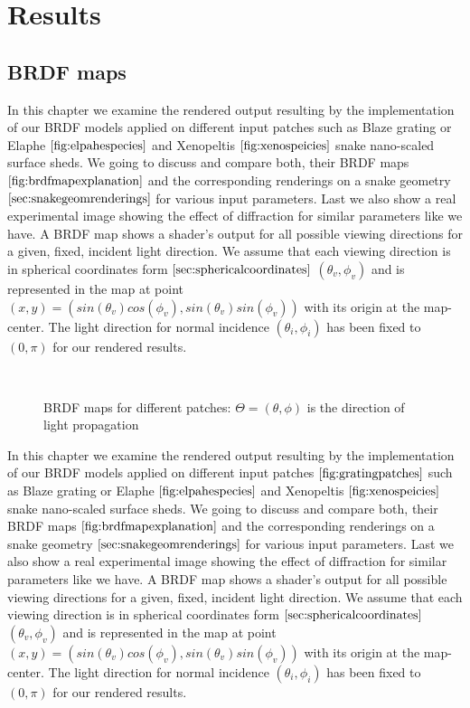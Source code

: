 \chapter{Results}
\section{BRDF maps}
In this chapter we examine the rendered output resulting by the implementation of our BRDF models applied on different input patches such as Blaze grating or Elaphe $\ref{fig:elpahespecies}$ and Xenopeltis $\ref{fig:xenospeicies}$ snake nano-scaled surface sheds. We going to discuss and compare both, their BRDF maps $\ref{fig:brdfmapexplanation}$ and the corresponding renderings on a snake geometry $\ref{sec:snakegeomrenderings}$ for various input parameters. Last we also show a real experimental image showing the effect of diffraction for similar parameters like we have. 
A BRDF map shows a shader's output for all possible viewing directions for a given, fixed, incident light direction. We assume that each viewing direction is in spherical coordinates form $\ref{sec:sphericalcoordinates}$ $(\theta_v, \phi_v)$ and is represented in the map at point $(x,y) = (sin(\theta_v)cos(\phi_v), sin(\theta_v)sin(\phi_v))$ with its origin at the map-center. The light direction for normal incidence $(\theta_i, \phi_i)$ has been fixed to $(0,\pi)$ for our rendered results.

\begin{figure}[H]
  \centering
~
~

\caption{BRDF maps for different patches: $\Theta=(\theta,\phi)$ is the direction of light propagation}
\label{fig:brdfmapexplanation}
\end{figure}

In this chapter we examine the rendered output resulting by the implementation of our BRDF models applied on different input patches $\ref{fig:gratingpatches}$ such as Blaze grating or Elaphe $\ref{fig:elpahespecies}$ and Xenopeltis $\ref{fig:xenospeicies}$ snake nano-scaled surface sheds. We going to discuss and compare both, their BRDF maps $\ref{fig:brdfmapexplanation}$ and the corresponding renderings on a snake geometry $\ref{sec:snakegeomrenderings}$ for various input parameters. Last we also show a real experimental image showing the effect of diffraction for similar parameters like we have. 
A BRDF map shows a shader's output for all possible viewing directions for a given, fixed, incident light direction. We assume that each viewing direction is in spherical coordinates form $\ref{sec:sphericalcoordinates}$ $(\theta_v, \phi_v)$ and is represented in the map at point $(x,y) = (sin(\theta_v)cos(\phi_v), sin(\theta_v)sin(\phi_v))$ with its origin at the map-center. The light direction for normal incidence $(\theta_i, \phi_i)$ has been fixed to $(0,\pi)$ for our rendered results.

